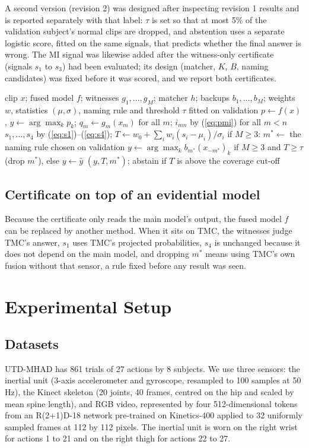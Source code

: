 \documentclass[conference]{IEEEtran}
\begin{document}
A second version (revision 2) was designed after inspecting revision 1 results and is reported separately with that label: $\tau$ is set so that at most 5\% of the validation subject's normal clips are dropped, and abstention uses a separate logistic score, fitted on the same signals, that predicts whether the final answer is wrong. The MI signal was likewise added after the witness-only certificate (signals $s_1$ to $s_3$) had been evaluated; its design (matcher, $K$, $B$, naming candidates) was fixed before it was scored, and we report both certificates.

\begin{algorithm}[t]
\caption{Certificate inference for one clip}
\label{alg:cert}
\begin{algorithmic}[1]
\Require clip $x$; fused model $f$; witnesses $g_1,\dots,g_M$; matcher $h$; backups $b_1,\dots,b_M$; weights $w$, statistics $(\mu,\sigma)$, naming rule and threshold $\tau$ fitted on validation
\State $p \gets f(x)$, $\hat{y}\gets\arg\max_k p_k$; $q_m \gets g_m(x_m)$ for all $m$; $i_{mn}$ by (\ref{eq:pmi}) for all $m<n$
\State $s_1,\dots,s_4$ by (\ref{eq:s1})--(\ref{eq:s4}); $T\gets w_0+\sum_i w_i(s_i-\mu_i)/\sigma_i$
\State if $M\geq 3$: $m^{\ast}\gets$ the naming rule chosen on validation
\State $y\gets\arg\max_k b_{m^{\ast}}(x_{-m^{\ast}})_k$ if $M\geq 3$ and $T\geq\tau$ (drop $m^{\ast}$), else $y\gets\hat{y}$
\State \Return $(y, T, m^{\ast})$; abstain if $T$ is above the coverage cut-off
\end{algorithmic}
\end{algorithm}

\subsection{Certificate on top of an evidential model}
Because the certificate only reads the main model's output, the fused model $f$ can be replaced by another method. When it sits on TMC, the witnesses judge TMC's answer, $s_1$ uses TMC's projected probabilities, $s_4$ is unchanged because it does not depend on the main model, and dropping $m^{\ast}$ means using TMC's own fusion without that sensor, a rule fixed before any result was seen.

\section{Experimental Setup}

\subsection{Datasets}
UTD-MHAD \cite{Ref2} has 861 trials of 27 actions by 8 subjects. We use three sensors: the inertial unit (3-axis accelerometer and gyroscope, resampled to 100 samples at 50 Hz), the Kinect skeleton (20 joints, 40 frames, centred on the hip and scaled by mean spine length), and RGB video, represented by four 512-dimensional tokens from an R(2+1)D-18 network \cite{Ref14} pre-trained on Kinetics-400 \cite{Ref15} applied to 32 uniformly sampled frames at 112 by 112 pixels. The inertial unit is worn on the right wrist for actions 1 to 21 and on the right thigh for actions 22 to 27.
\end{document}
